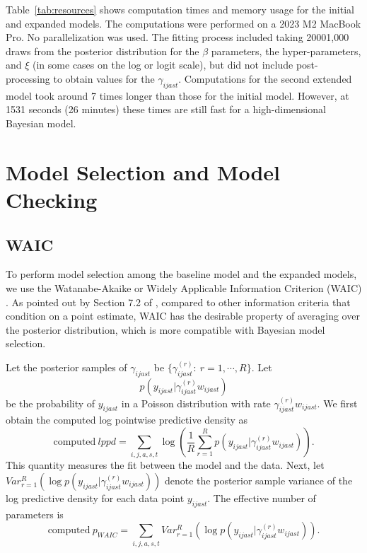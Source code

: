 \documentclass{article}
\begin{document}
{{\color{cyan} Table~\ref{tab:resources} shows computation times and memory usage for the initial and expanded models. The computations were performed on a 2023 M2 MacBook Pro. No parallelization was used. The fitting process included taking {\color{yellow}2000}{\color{magenta}1,000} draws from the posterior distribution for} {\color{magenta}the $\beta$ parameters,} the hyper-parameters{\color{magenta}, and $\xi$}{\color{yellow} (in some cases on the log or logit scale)}{\color{cyan}, but did not include post-processing to obtain values for the $\gamma_{ijast}$. Computations for the second extended model took around 7 times longer than those for the initial model. However, at 1531 seconds (26 minutes) these times are still fast for a high-dimensional Bayesian model.}



\section{Model Selection and Model Checking}

\subsection{WAIC}

To perform model selection among the baseline model and the expanded models, we use
 the Watanabe-Akaike or Widely Applicable Information Criterion (WAIC) \citep{watanabe2010asymptotic}. As pointed out by Section 7.2 of \cite{Gelman2014bayesian}, compared to other information criteria that condition on a point estimate, WAIC has the desirable property of averaging over the posterior distribution, which is more compatible with Bayesian model selection.

{\color{yellow}Let the posterior samples of $\gamma_{ijast}$ be $\{\gamma_{ijast}^{(r)}:\ r=1,\cdots,R\}$. Let $$p\left(y_{ijast}|\gamma_{ijast}^{(r)}w_{ijast}\right)$$ be the probability of $y_{ijast}$ in a Poisson distribution with rate $\gamma_{ijast}^{(r)}w_{ijast}$. We first obtain the computed log pointwise predictive density as
\begin{equation}
\text{computed}\ lppd=\sum_{i,j,a,s,t}\log\left(\frac{1}{R}\sum_{r=1}^R p\left(y_{ijast}|\gamma_{ijast}^{(r)}w_{ijast}\right)\right).
\end{equation}
This quantity measures the fit between the model and the data.
Next, let $Var_{r=1}^R \left(\log p\left(y_{ijast}|\gamma_{ijast}^{(r)}w_{ijast}\right)\right)$ denote the posterior sample variance of the log predictive density for each data point $y_{ijast}$. The effective number of parameters is 
\begin{equation}
\text{computed}\ p_{WAIC}=\sum_{i,j,a,s,t}Var_{r=1}^R \left(\log p\left(y_{ijast}|\gamma_{ijast}^{(r)}w_{ijast}\right)\right).
\end{equation}}

}
\end{document}
